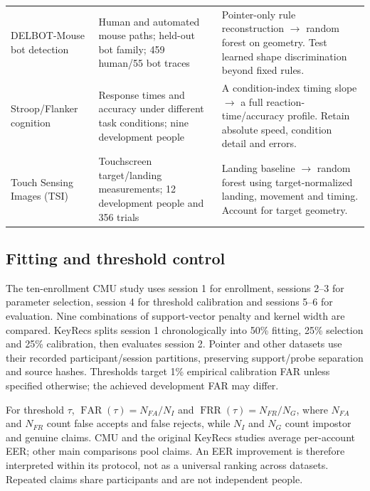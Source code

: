 \documentclass[10pt,a4paper]{article}
\begin{document}
\begin{center}
\begin{tabularx}{\linewidth}{@{}>{\raggedright\arraybackslash}p{30mm}>{\raggedright\arraybackslash}p{52mm}>{\raggedright\arraybackslash}X@{}}
DELBOT-Mouse bot detection & Human and automated mouse paths; held-out bot family; 459 human/55 bot traces & Pointer-only rule reconstruction $\rightarrow$ random forest on geometry. Test learned shape discrimination beyond fixed rules.\\
Stroop/Flanker cognition & Response times and accuracy under different task conditions; nine development people & A condition-index timing slope $\rightarrow$ a full reaction-time/accuracy profile. Retain absolute speed, condition detail and errors.\\
Touch Sensing Images (TSI) & Touchscreen target/landing measurements; 12 development people and 356 trials & Landing baseline $\rightarrow$ random forest using target-normalized landing, movement and timing. Account for target geometry.\\\bottomrule
\end{tabularx}
\end{center}

\subsection{Fitting and threshold control}
The ten-enrollment CMU study uses session 1 for enrollment, sessions 2--3 for parameter selection, session 4 for threshold calibration and sessions 5--6 for evaluation. Nine combinations of support-vector penalty and kernel width are compared. KeyRecs splits session 1 chronologically into 50\% fitting, 25\% selection and 25\% calibration, then evaluates session 2. Pointer and other datasets use their recorded participant/session partitions, preserving support/probe separation and source hashes. Thresholds target 1\% empirical calibration FAR unless specified otherwise; the achieved development FAR may differ.

For threshold $\tau$, $\operatorname{FAR}(\tau)=N_{FA}/N_I$ and $\operatorname{FRR}(\tau)=N_{FR}/N_G$, where $N_{FA}$ and $N_{FR}$ count false accepts and false rejects, while $N_I$ and $N_G$ count impostor and genuine claims. CMU and the original KeyRecs studies average per-account EER; other main comparisons pool claims. An EER improvement is therefore interpreted within its protocol, not as a universal ranking across datasets. Repeated claims share participants and are not independent people.
\end{document}
